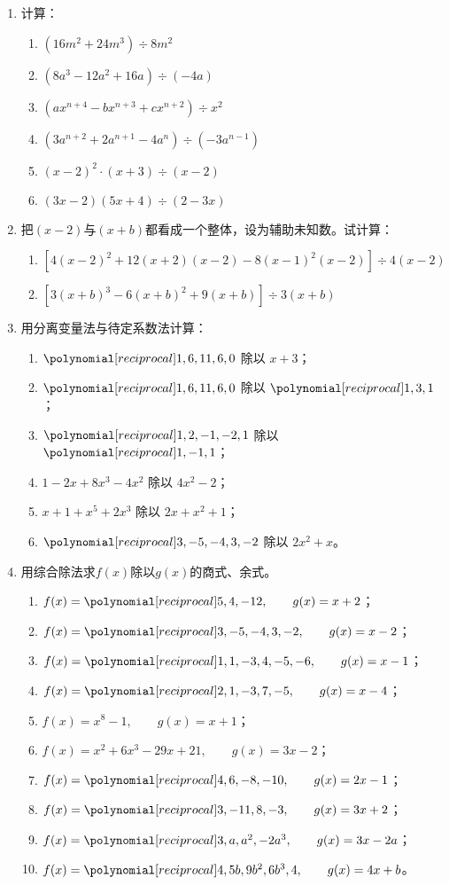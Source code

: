 \begin{enumerate}
    \item 计算：
\begin{enumerate}
    \item $(16m^2+24m^3)\div 8m^2$
    \item $(8a^3-12a^2+16a)\div (-4a)$
    \item $(ax^{n+4}-bx^{n+3}+cx^{n+2})\div x^2$
    \item $(3a^{n+2}+2a^{n+1}-4a^n)\div (-3a^{n-1})$
\item $(x-2)^2 \cdot (x+3)\div (x-2)$
\item $(3x-2)(5x+4)\div (2-3x)$
\end{enumerate}

\item 把$(x-2)$与$(x+b)$都看成一个整体，设为辅助未知数。试计算：
\begin{enumerate}
    \item $\left[4(x-2)^2+12(x+2)(x-2)-8(x-1)^2(x-2)\right]\div 4(x-2)$
    \item $\left[3(x+b)^3-6(x+b)^2+9(x+b)\right]\div 3(x+b)$
\end{enumerate}

\item 用分离变量法与待定系数法计算：

\begin{enumerate}
    \item $\poly{1,6,11,6,0}$ 除以 $x+3$；
    \item $\poly{1,6,11,6,0}$ 除以 $\poly{1,3,1}$；
    \item $\poly{1,2,-1,-2,1}$ 除以 $\poly{1,-1,1}$；
    \item $1-2x+8x^3-4x^2$ 除以 $4x^2-2$；
    \item $x+1+x^5+2x^3$ 除以 $2x+x^2+1$；
    \item $\poly{3,-5,-4,3,-2}$ 除以 $2x^2+x$。
\end{enumerate}

\item 用综合除法求$f(x)$除以$g(x)$的商式、余式。

\begin{enumerate}
    \item $f(x)=\poly{5,4,-12},\qquad g(x)=x+2$；
    \item $f(x)=\poly{3,-5,-4,3,-2},\qquad g(x)=x-2$；
    \item $f(x)=\poly{1,1,-3,4,-5,-6},\qquad g(x)=x-1$；
    \item $f(x)=\poly{2,1,-3,7,-5},\qquad g(x)=x-4$；
    \item $f(x)=x^8-1,\qquad g(x)=x+1$；
    \item $f(x)=x^2+6x^3-29x+21,\qquad g(x)=3x-2$；
    \item $f(x)=\poly{4,6,-8,-10},\qquad g(x)=2x-1$；
    \item $f(x)=\poly{3,-11,8,-3},\qquad g(x)=3x+2$；
    \item $f(x)=\poly{3,a,a^2,-2a^3},\qquad g(x)=3x-2a$；
    \item $f(x)=\poly{4,5b,9b^2,6b^3,4},\qquad g(x)=4x+b$。
\end{enumerate}


\end{enumerate}
